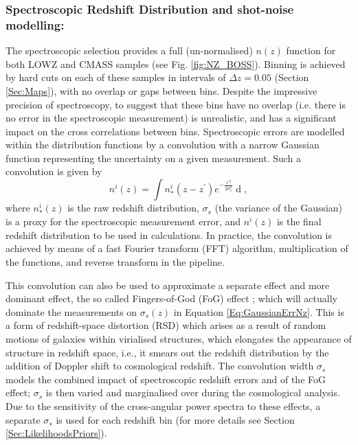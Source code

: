 \subsubsection{Spectroscopic Redshift Distribution and shot-noise modelling:}\label{Sec:SpecNz}
The spectroscopic selection provides a full (un-normalised) $n(z)$ function for both LOWZ and CMASS samples (see Fig. \ref{fig:NZ_BOSS}). Binning is achieved by hard cuts on each of these samples in intervals of $\Delta z = 0.05$ (Section \ref{Sec:Maps}), with no overlap or gaps between bins. Despite the impressive precision of spectroscopy, to suggest that these bins have no overlap (i.e. there is no error in the spectroscopic measurement) is unrealistic, and has a significant impact on the cross correlations between bins. Spectroscopic errors are modelled within the distribution functions by a convolution with a narrow Gaussian function representing the uncertainty on a given measurement. Such a convolution is given by
\begin{equation}
n^i(z) = \int n_*^i(z-z^\prime) e^{-\frac{z^{\prime 2}}{2\sigma_s^2}} \mathop{dz^\prime},
\label{Eq:GaussianErrNz}
\end{equation}
where $n_*^i(z)$ is the raw redshift distribution, $\sigma_s$ (the variance of the Gaussian) is a proxy for the spectroscopic measurement error, and $n^i(z)$ is the final redshift distribution to be used in calculations. In practice, the convolution is achieved by means of a fast Fourier transform (FFT) algorithm, multiplication of the functions, and reverse transform in the \uclcl pipeline.

\qquad This convolution can also be used to approximate a separate effect and more dominant effect, the so called Fingers-of-God (FoG) effect \citep{Percival-FoG2011}; which will actually dominate the measurements on $\sigma_s(z)$ in Equation \eqref{Eq:GaussianErrNz}. This is a form of redshift-space distortion (RSD) which arises as a result of random motions of galaxies within virialised structures, which elongates the appearance of structure in redshift space, i.e., it smears out the redshift distribution by the addition of Doppler shift to cosmological redshift. The convolution width $\sigma_s$ models the combined impact of spectroscopic redshift errors and of the FoG effect; $\sigma_s$ is then varied and marginalised over during the cosmological analysis. Due to the sensitivity of the cross-angular power spectra to these effects, a separate $\sigma_s$ is used for each redshift bin (for more details see Section \ref{Sec:LikelihoodsPriors}).

